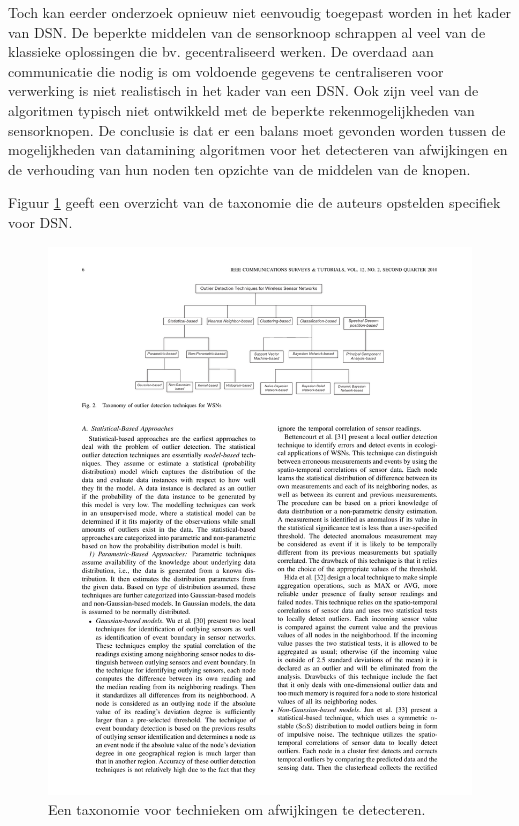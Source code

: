 Toch kan eerder onderzoek opnieuw niet eenvoudig toegepast worden in het kader
van DSN. De beperkte middelen van de sensorknoop schrappen al veel van de
klassieke oplossingen die bv. gecentraliseerd werken. De overdaad aan
communicatie die nodig is om voldoende gegevens te centraliseren voor
verwerking is niet realistisch in het kader van een DSN. Ook zijn veel van de
algoritmen typisch niet ontwikkeld met de beperkte rekenmogelijkheden van
sensorknopen. De conclusie is dat er een balans moet gevonden worden tussen de
mogelijkheden van datamining algoritmen voor het detecteren van afwijkingen en
de verhouding van hun noden ten opzichte van de middelen van de knopen.

Figuur \ref{fig:outlier-detection-taxonomy} geeft een overzicht van de
taxonomie die de auteurs opstelden specifiek voor DSN.

\begin{figure}[ht]
  \centering
  \includegraphics[width=\linewidth]{resources/outlier-detection-taxonomy.pdf}
  \caption{Een taxonomie voor technieken om afwijkingen te detecteren. \cite{zhang2010outlier}}
  \label{fig:outlier-detection-taxonomy}
\end{figure}

